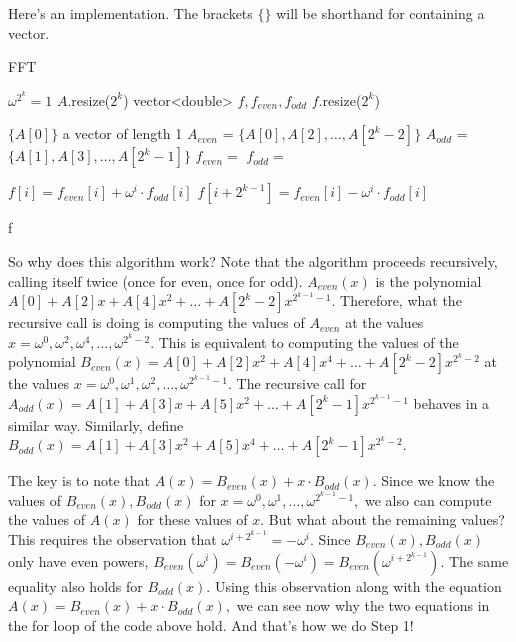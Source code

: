 Here's an implementation. The brackets $\{ \}$ will be shorthand for containing a vector.

\begin{algorithm}[H]
\caption{FFT}
\begin{algorithmic}
 \Comment $\omega^{2^k} = 1$
	\State $A$.resize($2^k$)
	\State vector<double> $f, f_{even}, f_{odd}$
	\State $f$.resize($2^k$)
	
		\State \Return $ \{A[0] \}$ \Comment a vector of length 1
    \EndIf
    \State $A_{even}$ = $ \{A[0], A[2], \dots, A[2^k-2] \}$
    \State $A_{odd}$ = $ \{A[1], A[3], \dots, A[2^k-1] \}$
    \State $f_{even} = $ 
    \State $f_{odd} = $ 
    
    	\State $f[i] = f_{even}[i] + \omega^i \cdot f_{odd}[i]$
	\State $f[i+2^{k-1}] = f_{even}[i] - \omega^i \cdot f_{odd}[i]$

	\EndFor

\Return f

\EndFunction

\end{algorithmic}
\end{algorithm}

So why does this algorithm work? Note that the algorithm proceeds recursively, calling itself twice (once for even, once for odd). $A_{even}(x)$ is the polynomial $A[0] + A[2]x + A[4]x^2 + \dots + A[2^k-2]x^{2^{k-1}-1}.$ Therefore, what the recursive call is doing is computing the values of $A_{even}$ at the values $x = \omega^0, \omega^2, \omega^4, \dots, \omega^{2^k-2}.$ This is equivalent to computing the values of the polynomial $B_{even}(x) = A[0] + A[2]x^2 + A[4]x^4 + \dots + A[2^k-2]x^{2^{k}-2}$ at the values $x = \omega^0, \omega^1, \omega^2, \dots, \omega^{2^{k-1}-1}.$ The recursive call for $A_{odd}(x) = A[1] + A[3]x + A[5]x^2 + \dots + A[2^k-1]x^{2^{k-1}-1}$ behaves in a similar way. Similarly, define $B_{odd}(x) = A[1] + A[3]x^2 + A[5]x^4 + \dots + A[2^k-1]x^{2^{k}-2}.$

The key is to note that $A(x) = B_{even}(x) + x \cdot B_{odd}(x).$ Since we know the values of $B_{even}(x), B_{odd}(x)$ for $x = \omega^0, \omega^1, \dots, \omega^{2^{k-1}-1},$ we also can compute the values of $A(x)$ for these values of $x$. But what about the remaining values? This requires the observation that $\omega^{i + 2^{k-1}} = -\omega^i.$ Since $B_{even}(x), B_{odd}(x)$ only have even powers, $B_{even}(\omega^i) = B_{even}(-\omega^i) = B_{even}(\omega^{i + 2^{k-1}}).$ The same equality also holds for $B_{odd}(x).$ Using this observation along with the equation $A(x) = B_{even}(x) + x \cdot B_{odd}(x),$ we can see now why the two equations in the for loop of the code above hold. And that's how we do Step 1!

